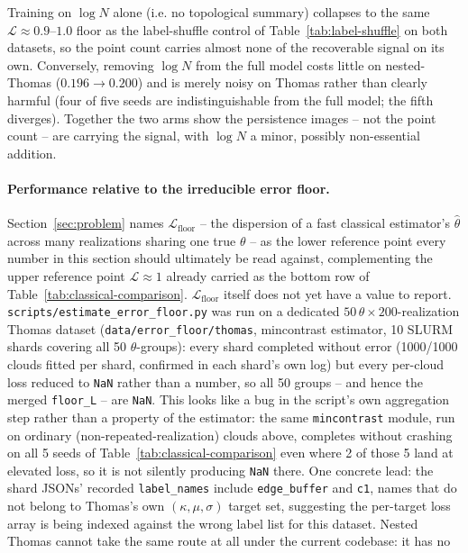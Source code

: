 \documentclass[11pt,letterpaper]{article}
\newcommand{\1}{\mathds{1}}
\theoremstyle{plain}
\theoremstyle{definitioncolon}
\begin{document}
Training on $\log N$ alone (i.e. no topological summary) collapses to the same
$\mathcal{L}\approx0.9$--$1.0$ floor as the label-shuffle control of
Table~\ref{tab:label-shuffle} on both datasets, so the point count carries
almost none of the recoverable signal on its own. Conversely, removing $\log N$ from the
full model costs little on nested-Thomas ($0.196\to0.200$) and is
merely noisy on Thomas rather than clearly harmful (four of five seeds are
indistinguishable from the full model; the fifth diverges). Together the two
arms show the persistence images -- not the point count -- are carrying the
signal, with $\log N$ a minor, possibly non-essential addition.

\paragraph{Performance relative to the irreducible error floor.}
Section~\ref{sec:problem} names $\mathcal{L}_{\text{floor}}$ -- the
dispersion of a fast classical estimator's $\hat\theta$ across many
realizations sharing one true $\theta$ -- as the lower reference point every
number in this section should ultimately be read against, complementing the
upper reference point $\mathcal{L}\approx1$ already carried as the bottom row
of Table~\ref{tab:classical-comparison}. $\mathcal{L}_{\text{floor}}$ itself
does not yet have a value to report.
\texttt{scripts/estimate\_error\_floor.py} was run on a dedicated
$50\,\theta \times 200$-realization Thomas dataset
(\texttt{data/error\_floor/thomas}, mincontrast estimator, 10 SLURM shards
covering all 50 $\theta$-groups): every shard completed without error
(1000/1000 clouds fitted per shard, confirmed in each shard's own log) but
every per-cloud loss reduced to \texttt{NaN} rather than a number, so all 50
groups -- and hence the merged \texttt{floor\_L} -- are \texttt{NaN}. This
looks like a bug in the script's own aggregation step rather than a property
of the estimator: the same \texttt{mincontrast} module, run on ordinary
(non-repeated-realization) clouds above, completes without crashing on all
5 seeds of Table~\ref{tab:classical-comparison} even where 2 of those 5 land
at elevated loss, so it is not silently producing \texttt{NaN} there. One
concrete lead: the shard JSONs' recorded \texttt{label\_names} include
\texttt{edge\_buffer} and \texttt{c1}, names that do not belong to Thomas's
own $(\kappa,\mu,\sigma)$ target set, suggesting the per-target loss array is
being indexed against the wrong label list for this dataset. Nested Thomas
cannot take the same route at all under the current codebase: it has no
\end{document}

